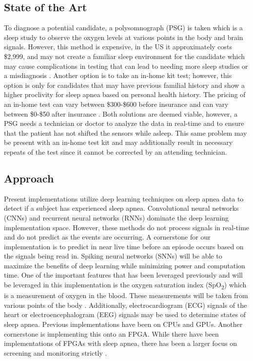 \documentclass[12pt,titlepage]{article}
\begin{document}
\subsection{State of the Art}
To diagnose a potential candidate, a polysomnograph (PSG) is taken which is a sleep study to observe the oxygen levels at various points in the body
and brain signals. However, this method is expensive, in the US it approximately costs \$2,999, and may not create a familiar sleep environment
for the candidate which may cause complications in testing that can lead to needing more sleep studies or a misdiagnosis \cite{mdsave}. Another
option is to take an in-home kit test; however, this option is only for candidates that may have previous familial history and show a higher proclivity
for sleep apnea based on personal health history. The pricing of an in-home test can vary between \$300-\$600 before insurance and can vary between
\$0-\$50 after insurance \cite{rodriguez_2016}. Both solutions are deemed viable, however, a PSG needs a technician or doctor to analyze the data in
real-time and to ensure that the patient has not shifted the sensors while asleep. This same problem may be present with an in-home test kit and may
additionally result in necessary repeats of the test since it cannot be corrected by an attending technician. 

\subsection{Approach}
	Present implementations utilize deep learning techniques on sleep apnea data to detect if a subject has experienced sleep apnea. Convolutional neural networks (CNNs) and recurrent neural networks (RNNs) dominate the deep learning implementation space. However, these methods do not process signals in
real-time and do not predict as the events are occurring. A cornerstone for our implementation is to predict in near live time before an episode occurs
based on the signals being read in. Spiking neural networks (SNNs) will be able to maximize the benefits of deep learning while minimizing power and computation
time. One of the important features that has been leveraged previously and will be leveraged in this implementation is the oxygen saturation index (SpO\textsubscript{2})
which is a measurement of oxygen in the blood. These measurements will be taken from various points of the body \cite{mostafa}. Additionally, electrocardiogram
(ECG) signals of the heart or electroencephalogram (EEG) signals may be used to determine states of sleep apnea. Previous implementations have been on CPUs and GPUs. Another cornerstone is implementing this onto an FPGA. While there have been implementations of FPGAs with sleep apnea, there has been a larger focus on screening and monitoring strictly \cite{ashmouny}.
\end{document}
